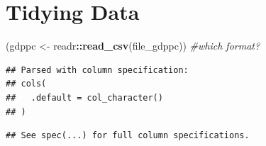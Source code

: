 \documentclass[11pt,]{article}
\newenvironment{Shaded}{\begin{snugshade}}{\end{snugshade}}
\newcommand{\KeywordTok}[1]{\textcolor[rgb]{0.13,0.29,0.53}{\textbf{#1}}}
\newcommand{\StringTok}[1]{\textcolor[rgb]{0.31,0.60,0.02}{#1}}
\newcommand{\CommentTok}[1]{\textcolor[rgb]{0.56,0.35,0.01}{\textit{#1}}}
\newcommand{\OperatorTok}[1]{\textcolor[rgb]{0.81,0.36,0.00}{\textbf{#1}}}
\newcommand{\NormalTok}[1]{#1}
\begin{document}
\section{Tidying Data}\label{tidying-data}

\begin{Shaded}
\begin{Highlighting}[]
\NormalTok{(gdppc <-}\StringTok{ }\NormalTok{readr}\OperatorTok{::}\KeywordTok{read_csv}\NormalTok{(file_gdppc)) }\CommentTok{#which format?}
\end{Highlighting}
\end{Shaded}

\begin{verbatim}
## Parsed with column specification:
## cols(
##   .default = col_character()
## )
\end{verbatim}

\begin{verbatim}
## See spec(...) for full column specifications.
\end{verbatim}
\end{document}
